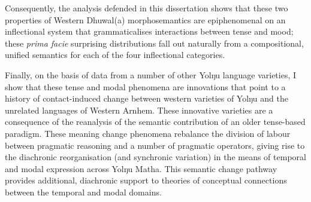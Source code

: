Consequently, the analysis defended in this dissertation shows that these two properties of Western Dhuwal(a) morphosemantics are epiphenomenal on an inflectional system that grammaticalises interactions between tense and mood; these \textit{prima facie} surprising distributions fall out naturally from a compositional, unified semantics for each of the four inflectional categories.

Finally, on the basis of data from a number of other Yolŋu language varieties, I show that these tense and modal phenomena are innovations that point to a history of contact-induced change between western varieties of Yolŋu and the unrelated languages of Western Arnhem. These innovative varieties are a consequence of the reanalysis of the semantic contribution of an older tense-based paradigm. These meaning change phenomena rebalance the division of labour between pragmatic reasoning and a number of pragmatic operators, giving rise to the diachronic reorganisation (and synchronic variation) in the means of temporal and modal expression across Yolŋu Matha. This semantic change pathway provides additional, diachronic support to theories of conceptual connections between the temporal and modal domains.